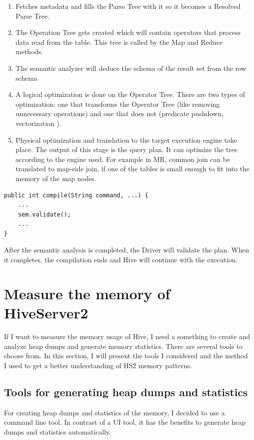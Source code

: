 \begin{enumerate}
	\item Fetches metadata and fills the Parse Tree with it so it becomes a Resolved Parse Tree.
	\item The Operation Tree gets created which will contain operators that process data read from the table. This tree is called by the Map and Reduce methods.
	\item The semantic analyzer will deduce the schema of the result set from the row schema
	\item A logical optimization is done on the Operator Tree. There are two types of optimization: one that transforms the Operator Tree (like removing unnecessary operations) and one that does not (predicate pushdown, vectorization \etc).
	\item Physical optimization and translation to the target execution engine take place. The output of this stage is the query plan. It can optimize the tree according to the engine used. For example in MR, common join can be translated to map-side join, if one of the tables is small enough to fit into the memory of the map nodes.
\end{enumerate}

\begin{lstlisting}
public int compile(String command, ...) {
	...
	sem.validate();
	...
}
\end{lstlisting}

After the semantic analysis is completed, the Driver will validate the plan. When it completes, the compilation ends and Hive will continue with the execution.

\clearpage
\section{Measure the memory of HiveServer2}
If I want to measure the memory usage of Hive, I need a something to create and analyze heap dumps and generate memory statistics. There are several tools to choose from. In this section, I will present the tools I considered and the method I used to get a better understanding of HS2 memory patterns.

\subsection{Tools for generating heap dumps and statistics}
For creating heap dumps and statistics of the memory, I decided to use a command line tool. In contrast of a UI tool, it has the benefits to generate heap dumps and statistics automatically. 

